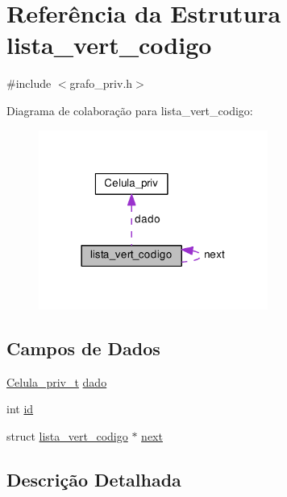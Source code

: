\hypertarget{structlista__vert__codigo}{}\section{Referência da Estrutura lista\+\_\+vert\+\_\+codigo}
\label{structlista__vert__codigo}


{\ttfamily \#include $<$grafo\+\_\+priv.\+h$>$}



Diagrama de colaboração para lista\+\_\+vert\+\_\+codigo\+:\nopagebreak
\begin{figure}[H]
\begin{center}
\leavevmode
\includegraphics[width=213pt]{structlista__vert__codigo__coll__graph}
\end{center}
\end{figure}
\subsection*{Campos de Dados}
\begin{DoxyCompactItemize}
\item 
\hyperlink{grafo_8h_ac2219b5d1f94e440b5895ce440ab23b9}{Celula\+\_\+priv\+\_\+t} \hyperlink{structlista__vert__codigo_a8e51b3141307b34cb74d6433a136f73b}{dado}
\item 
int \hyperlink{structlista__vert__codigo_acc7c3bce66ab242ba6e64e763dfb63b3}{id}
\item 
struct \hyperlink{structlista__vert__codigo}{lista\+\_\+vert\+\_\+codigo} $\ast$ \hyperlink{structlista__vert__codigo_af1cac7f22cb6142a13bd1f9c41f4c0b5}{next}
\end{DoxyCompactItemize}


\subsection{Descrição Detalhada}


